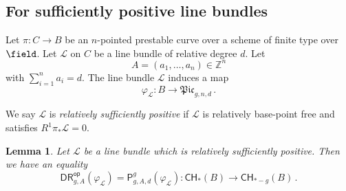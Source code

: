 \documentclass[a4paper,12pt]{article} %
\newcommand{\ca}[1]{{\mathcal{#1}}}
\def\P{\mathsf{P}}
\theoremstyle{definition}
\theoremstyle{plain}%
\newtheorem{lemma}[definition]{Lemma}
\renewcommand{\phi}{\varphi}
\newcommand{\Picabs}{\mathfrak{Pic}}
\newcommand{\Chow}{\mathsf{CH}}
\newcommand{\DRop}{\mathsf{DR}^{\mathsf{op}}}
\begin{document}
\subsection{For sufficiently positive line bundles}\label{sec:positive_line_bundle}

Let $\pi\colon C\to B$ be an $n$-pointed prestable curve over a scheme of finite type over ${\field}$. Let
$\ca L$ on $C$ be a line bundle 
of relative degree $d$. 
Let $$A = (a_1,\ldots, a_n) \in\mathbb{Z}^n$$ with $\sum_{i=1}^n a_i = d$.  
The line bundle $\ca L$ induces a map 
$$\phi_{\ca L} \colon B \to \Picabs_{g,n,d}\, .$$

We say $\ca L$ is \emph{relatively sufficiently positive} if $\ca L$ is relatively base-point free  and satisfies $R^1\pi_*\ca L = 0$. 


\begin{lemma}\label{sec:very_ample}
Let $\ca L$ be a line bundle which is relatively sufficiently positive. 
Then we have an equality  
\begin{equation}\label{eq:very_ample}
\DRop_{g,A}(\phi_{\ca L})=
\P_{g,A,d}^g(\phi_{\ca L})  \colon \Chow_*(B) \to \Chow_{*-g}(B)\, .
\end{equation}

\end{lemma}
\end{document}
